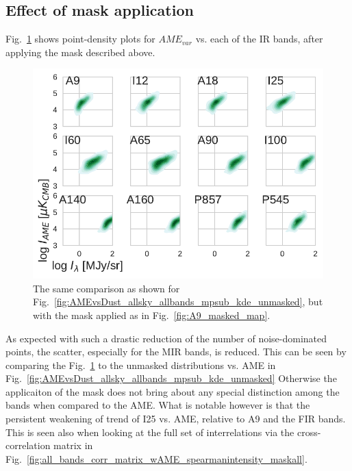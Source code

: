         \subsection{Effect of mask application}
            Fig.~\ref{fig:AMEvsDust_allsky_allbands_mpsub_kde_masked} shows point-density plots for $AME_{var}$ vs. each of the IR bands, after applying the mask described above.
               \begin{figure}
                 \includegraphics[width=\textwidth]{../Plots/ch_allsky/AMEvsDust_allsky_allbands_mpsub_kde_masked.pdf}
                 \centering
                 \caption{The same comparison as shown for Fig.~\ref{fig:AMEvsDust_allsky_allbands_mpsub_kde_unmasked}, but with the mask applied as in Fig.~\ref{fig:A9_masked_map}.}
                 \label{fig:AMEvsDust_allsky_allbands_mpsub_kde_masked}
               \end{figure}
            As expected with such a drastic reduction of the number of noise-dominated points, the scatter, especially for the MIR bands, is reduced. This can be seen by comparing the Fig.~\ref{fig:AMEvsDust_allsky_allbands_mpsub_kde_masked} to the unmasked distributions vs. AME in Fig.~\ref{fig:AMEvsDust_allsky_allbands_mpsub_kde_unmasked} Otherwise the applicaiton of the mask does not bring about any special distinction among the bands when compared to the AME. What is notable however is that the persistent weakening of trend of I25 vs. AME, relative to A9 and the FIR bands. This is seen also when looking at the full set of interrelations via the cross-correlation matrix in Fig.~\ref{fig:all_bands_corr_matrix_wAME_spearmanintensity_maskall}.
